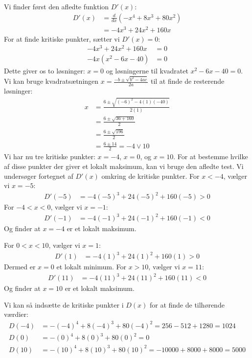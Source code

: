 \documentclass{article}
\theoremstyle{definition}
\theoremstyle{remark}
\begin{document}
Vi finder først den afledte funktion $D'(x)$:
\begin{align*}
D'(x) &= \frac{d}{dx}(-x^4 + 8x^3 + 80x^2) \\
&= -4x^3 + 24x^2 + 160x
\end{align*}
For at finde kritiske punkter, sætter vi $D'(x) = 0$:
\begin{align*}
-4x^3 + 24x^2 + 160x &= 0 \\
-4x(x^2 - 6x - 40) &= 0
\end{align*}
Dette giver os to løsninger: $x = 0$ og løsningerne til kvadratet $x^2 - 6x - 40 = 0$. Vi kan bruge kvadratsætningen $x = \frac{-b \pm \sqrt{b^2 - 4ac}}{2a}$ til at finde de resterende løsninger:
\begin{align*}
x &= \frac{6 \pm \sqrt{(-6)^2 - 4(1)(-40)}}{2(1)} \\
&= \frac{6 \pm \sqrt{36 + 160}}{2} \\
&= \frac{6 \pm \sqrt{196}}{2} \\
&= \frac{6 \pm 14}{2} = -4 \vee  10
\end{align*}
Vi har nu tre kritiske punkter: $x = -4$, $x = 0$, og $x = 10$. For at bestemme hvilke af disse punkter der giver et lokalt maksimum, kan vi bruge den afledte test. Vi undersøger fortegnet af $D'(x)$ omkring de kritiske punkter.
For $x < -4$, vælger vi $x = -5$:
\begin{align*}
D'(-5) &= -4(-5)^3 + 24(-5)^2 + 160(-5) > 0
\end{align*}
For $-4 < x < 0$, vælger vi $x = -1$:
\begin{align*}
D'(-1) &= -4(-1)^3 + 24(-1)^2 + 160(-1) < 0
\end{align*}
Og finder at $x=-4$ er et lokalt maksimum. \vspace{1em}

For $0 < x < 10$, vælger vi $x = 1$:
\begin{align*}
D'(1) &= -4(1)^3 + 24(1)^2 + 160(1) > 0
\end{align*}
Dermed er $x=0$ et lokalt minimum. \vspace{1em}
For $x > 10$, vælger vi $x = 11$:
\begin{align*}
D'(11) &= -4(11)^3 + 24(11)^2 + 160(11) < 0
\end{align*}
Og finder at $x=10$ er et lokalt maksimum. \vspace{1em}

Vi kan så indsætte de kritiske punkter i $D(x)$ for at finde de tilhørende værdier:
\begin{align*}
D(-4) &= -(-4)^4 + 8(-4)^3 + 80(-4)^2 = 256 - 512 + 1280 = 1024 \\
D(0) &= -(0)^4 + 8(0)^3 + 80(0)^2 = 0 \\
D(10) &= -(10)^4 + 8(10)^3 + 80(10)^2 = -10000 + 8000 + 8000 = 5000
\end{align*}
\end{document}
